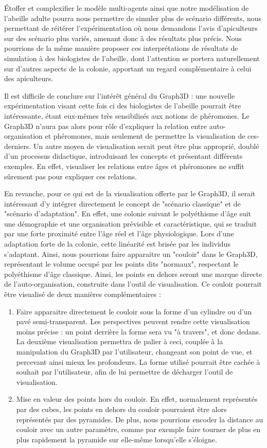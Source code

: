 	Étoffer et complexifier le modèle multi-agents ainsi que notre modélisation de l'abeille adulte pourra nous permettre de simuler plus de scénario différents, nous permettant de réitérer l'expérimentation où nous demandons l'avis d'apiculteurs sur des scénario plus variés, amenant donc à des résultats plus précis. Nous pourrions de la même manière proposer ces interprétations de résultats de simulation à des biologistes de l'abeille, dont l'attention se portera naturellement sur d'autres aspects de la colonie, apportant un regard complémentaire à celui des apiculteurs.

Il est difficile de conclure sur l'intérêt général du Graph3D : une nouvelle expérimentation visant cette fois ci des biologistes de l'abeille pourrait être intéressante, étant eux-mêmes très sensibilisés aux notions de phéromones. Le Graph3D n'aura pas alors pour rôle d'expliquer la relation entre auto-organisation et phéromones, mais seulement de permettre la visualisation de ces-derniers. Un autre moyen de visualisation serait peut être plus approprié, doublé d'un processus didactique, introduisant les concepts et présentant différents exemples. En effet, visualiser les relations entre âges et phéromones ne suffit sûrement pas pour expliquer ces relations.

	En revanche, pour ce qui est de la visualisation offerte par le Graph3D, il serait intéressant d'y intégrer directement le concept de "scénario classique" et de "scénario d'adaptation". En effet, une colonie suivant le polyéthisme d'âge suit une démographie et une organisation prévisible et caractéristique, qui se traduit par une forte proximité entre l'âge réel et l'âge physiologique. Lors d'une adaptation forte de la colonie, cette linéarité est brisée par les individus s'adaptant. Ainsi, nous pourrions faire apparaitre un "couloir" dans le Graph3D, représentant le volume occupé par les points dits "normaux", respectant le polyéthisme d'âge classique. Ainsi, les points en dehors seront une marque directe de l'auto-organisation, construite dans l'outil de visualisation. Ce couloir pourrait être visualisé de deux manières complémentaires :
	\begin{enumerate}
		\item Faire apparaitre directement le couloir sous la forme d'un cylindre ou d'un pavé semi-transparent. Les perspectives peuvent rendre cette visualisation moins précise : un point derrière la forme sera vu "à travers", et donc dedans. La deuxième visualisation permettra de palier à ceci, couplée à la manipulation du Graph3D par l'utilisateur, changeant son point de vue, et percevant ainsi mieux les profondeurs. La forme utilisé pourrait être cachée à souhait par l'utilisateur, afin de lui permettre de décharger l'outil de visualisation.
		\item Mise en valeur des points hors du couloir. En effet, normalement représentés par des cubes, les points en dehors du couloir pourraient être alors représentés par des pyramides. De plus, nous pourrions encoder la distance au couloir avec un autre paramètre, comme par exemple faire tourner de plus en plus rapidement la pyramide sur elle-même lorsqu'elle s'éloigne.
	\end{enumerate}
	
